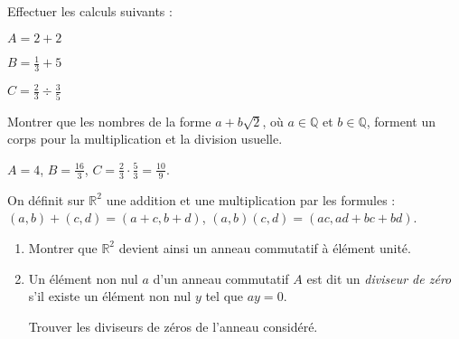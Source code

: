 
 \begin{exo}[type=solution]
 Effectuer les calculs suivants : \par
 $A=2+2$ \par  $B=\frac{1}{3}+5$ \par  
 $C=\frac{2}{3} \div \frac{3}{5}$
 \end{exo}

 \begin{exo}
 Montrer que les nombres de la forme $a+b\sqrt2$, où $a \in \mathbb{Q}$ et $b \in \mathbb{Q}$, forment un corps pour la multiplication et la division usuelle.
 \begin{sol}
  $A=4$, $B=\frac{16}{3}$, $C=\frac{2}{3} \cdot \frac{5}{3} = \frac{10}{9}$.  
 \end{sol}
 \end{exo}
 
  \begin{exo}
   On définit sur $\mathbb{R}^2$ une addition et une multiplication par les formules :
   $(a,b)+(c,d)=(a+c,b+d)$, $(a,b)(c,d) = (ac,ad+bc+bd)$.
   
   \begin{enumerate}
   \item Montrer que $\mathbb{R}^2$ devient ainsi un anneau commutatif à élément unité.
   \item Un élément non nul $a$ d'un anneau commutatif $A$ est dit un \textsl{diviseur de zéro} s'il existe un élément non nul $y$ tel que $ay=0$.
   
   Trouver les diviseurs de zéros de l'anneau considéré.
   \end{enumerate}
   
  \end{exo}